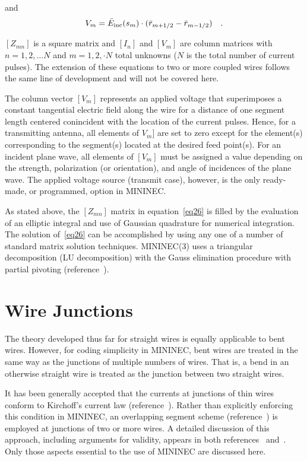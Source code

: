 \documentclass[12pt]{article}
\begin{document}
and
\begin{equation}
V_m = \bar{E}_{\mathrm{inc}}(s_m)\cdot(\bar{r}_{m+1/2}-\bar{r}_{m-1/2})
\quad.
\label{eq28}
\end{equation}

$[Z_{mn}]$ is a square matrix and $[I_n]$ and $[V_m]$ are column
matrices with $n=1,2,\ldots N$ and $m=1,2,\cdot N$ total unknowns ($N$ is
the total number of current pulses). The extension of these equations to
two or more coupled wires follows the same line of development and will
not be covered here.

The column vector $[V_m]$ represents an applied voltage that
superimposes a constant tangential electric field along the wire for a
distance of one segment length centered conincident with the location of
the current pulses. Hence, for a transmitting antenna, all elements of
$V_m]$ are set to zero except for the element(s) corresponding to the
segment(s) located at the desired feed point(s). For an incident plane
wave, all elements of $[V_m]$ must be assigned a value depending on the
strength, polarization (or orientation), and angle of incidences of the
plane wave. The applied voltage source (transmit case), however, is the
only ready-made, or programmed, option in MININEC.

As stated above, the $[Z_{mn}]$ matrix in equation~\eqref{eq26} is
filled by the evaluation of an elliptic integral and use of Gaussian
quadrature for numerical integration. The solution of~\eqref{eq26} can
be accomplished by using any one of a number of standard matrix solution
techniques. MININEC(3) uses a triangular decomposition (LU
decomposition) with the Gauss elimination procedure with partial
pivoting (reference~\cite{r7}).

\section{Wire Junctions}
The theory developed thus far for straight wires is equally applicable
to bent wires. However, for coding simplicity in MININEC, bent wires are
treated in the same way as the junctions of multiple numbers of wires.
That is, a bend in an otherwise straight wire is treated as the junction
between two straight wires.

It has been generally accepted that the currents at junctions of thin
wires conform to Kirchoff's current law (reference~\cite{r10}). Rather
than explicitly enforcing this condition in MININEC, an overlapping
segment scheme (reference~\cite{r11}) is employed at junctions of two or
more wires. A detailed discussion of this approach, including arguments
for validity, appears in both references~\cite{r8} and~\cite{r9}. Only
those aspects essential to the use of MININEC are discussed here.
\end{document}
